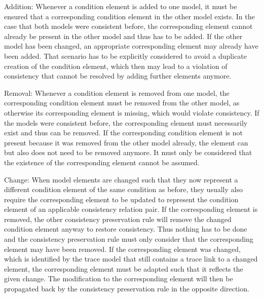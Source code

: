 \begin{properdescription}
    \item[Addition:] Whenever a condition element is added to one model, it must be ensured that a corresponding condition element in the other model exists.
    In the case that both models were consistent before, the corresponding element cannot already be present in the other model and thus has to be added.
    If the other model has been changed, an appropriate corresponding element may already have been added.
    That scenario has to be explicitly considered to avoid a duplicate creation of the condition element, which then may lead to a violation of consistency that cannot be resolved by adding further elements anymore.
    \item[Removal:] Whenever a condition element is removed from one model, the corresponding condition element must be removed from the other model, as otherwise its corresponding element is missing, which would violate consistency.
    If the models were consistent before, the corresponding element must necessarily exist and thus can be removed.
    If the corresponding condition element is not present because it was removed from the other model already, the element can but also does not need to be removed anymore.
    It must only be considered that the existence of the corresponding element cannot be assumed.
    \item[Change:] When model elements are changed such that they now represent a different condition element of the same condition as before, they usually also require the corresponding element to be updated to represent the condition element of an applicable consistency relation pair.
    If the corresponding element is removed, the other consistency preservation rule will remove the changed condition element anyway to restore consistency.
    Thus nothing has to be done and the consistency preservation rule must only consider that the corresponding element may have been removed.
    If the corresponding element was changed, which is identified by the trace model that still contains a trace link to a changed element, the corresponding element must be adapted such that it reflects the given change.
    The modification to the corresponding element will then be propagated back by the consistency preservation rule in the opposite direction.
\end{properdescription}

